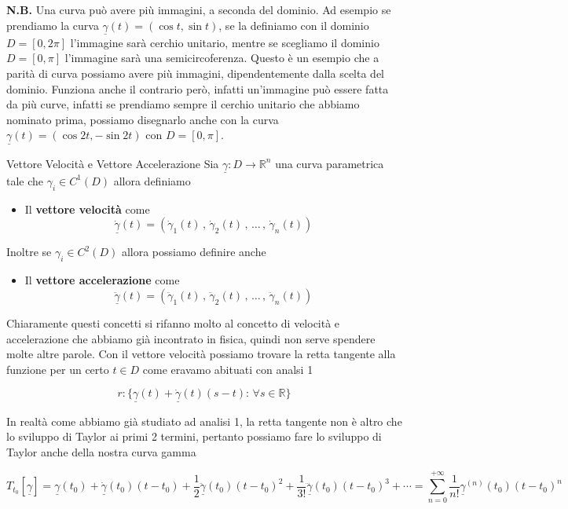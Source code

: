 \documentclass{rapport}
\begin{document}
\textbf{N.B.} Una curva può avere più immagini, a seconda del dominio. Ad esempio se prendiamo la curva $\underline{\gamma}(t) = (\cos t, \sin t)$, se la definiamo con il dominio $D = [0, 2\pi]$ l'immagine sarà cerchio unitario, mentre se scegliamo il dominio $D=[0, \pi]$ l'immagine sarà una semicircoferenza. Questo è un esempio che a parità di curva possiamo avere più immagini, dipendentemente dalla scelta del dominio. Funziona anche il contrario però, infatti un'immagine può essere fatta da più curve, infatti se prendiamo sempre il cerchio unitario che abbiamo nominato prima, possiamo disegnarlo anche con la curva $\underline{\gamma}(t)=(\cos 2t, -\sin 2t)$ con $D=[0, \pi]$.


\begin{definizione}{Vettore Velocità e Vettore Accelerazione}{}
  Sia $\underline{\gamma}: D \to \mathbb{R}^n$ una curva parametrica tale che $\gamma_i \in C^1(D)$ allora definiamo
\begin{itemize}
  \item Il \textbf{vettore velocità} come 
  \[
  \underline{\dot{\gamma}}(t) =  (\dot{\gamma}_1(t)\, , \, \dot{\gamma}_2(t)\, ,\, \dots \, ,\, \dot{\gamma}_n(t) )
  \]
\end{itemize}

Inoltre se $\gamma_i \in C^2(D)$ allora possiamo definire anche 
\begin{itemize}
  \item Il \textbf{vettore accelerazione} come 
  \[
  \underline{\ddot{\gamma}}(t) =  (\ddot{\gamma}_1(t)\, , \, \ddot{\gamma}_2(t)\, ,\, \dots \, ,\, \ddot{\gamma}_n(t) )
  \]
\end{itemize}

\end{definizione}


Chiaramente questi concetti si rifanno molto al concetto di velocità e accelerazione che abbiamo già incontrato in fisica, quindi non serve spendere molte altre parole. Con il vettore velocità possiamo trovare la retta tangente alla funzione per un certo $t\in D$ come eravamo abituati con analsi 1

\[
r: \{\underline{\gamma}(t) + \underline{\dot{\gamma}}(t)(s-t): \, \forall s \in \mathbb{R}\}
\]

In realtà come abbiamo già studiato ad analisi 1, la retta tangente non è altro che lo sviluppo di Taylor ai primi 2 termini, pertanto possiamo fare lo sviluppo di Taylor anche della nostra curva gamma 

\[
T_{t_0}[\underline{\gamma}] = \underline{\gamma}(t_0) + \underline{\dot{\gamma}}(t_0)(t-t_0)+ \dfrac{1}{2}\underline{\ddot{\gamma}}(t_0)(t-t_0)^2 +  \dfrac{1}{3!}\underline{\dddot{\gamma}}(t_0)(t-t_0)^3 + \cdots = \sum_{n=0}^{+\infty} \dfrac{1}{n!} \underline{\gamma}^{(n)}(t_0) (t-t_0)^n
\]
\end{document}
